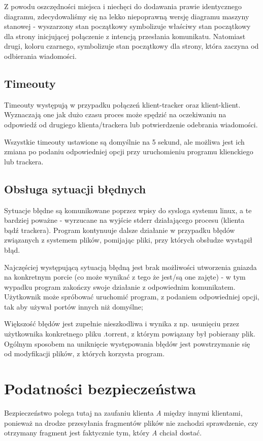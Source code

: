 \documentclass[11pt]{article}
\begin{document}
Z powodu oszczędności miejsca i niechęci do dodawania prawie identycznego diagramu, zdecydowaliśmy się na lekko niepoprawną wersję diagramu maszyny stanowej - wyszarzony stan początkowy symbolizuje właściwy stan początkowy dla strony inicjującej połączenie z intencją przesłania komunikatu. Natomiast drugi, koloru czarnego, symbolizuje stan początkowy dla strony, która zaczyna od odbierania wiadomości.

\subsection{Timeouty}
Timeouty występują w przypadku połączeń klient-tracker oraz klient-klient. Wyznaczają one jak dużo czasu proces może spędzić na oczekiwaniu na odpowiedź od drugiego klienta/trackera lub potwierdzenie odebrania wiadomości.	


Wszystkie timeouty ustawione są domyślnie na 5 sekund, ale możliwa jest ich zmiana po podaniu odpowiedniej opcji przy uruchomieniu programu klienckiego lub trackera.

\subsection{Obsługa sytuacji błędnych}
Sytuacje błędne są komunikowane poprzez wpisy do sysloga systemu linux, a te bardziej poważne - wyrzucane na wyjście stderr działającego procesu (klienta bądź trackera).	Program kontynuuje dalsze działanie w przypadku błędów związanych z systemem plików, pomijając pliki, przy których obsłudze wystąpił błąd.

Najczęściej występującą sytuacją błędną jest brak możliwości utworzenia gniazda na konkretnym porcie (co może wynikać z tego że jest/są one zajęte) - w tym wypadku program zakończy swoje działanie z odpowiednim komunikatem. Użytkownik może spróbować uruchomić program, z podaniem odpowiedniej opcji, tak aby używał portów innych niż domyślne;

Większość błędów jest zupełnie nieszkodliwa i wynika z np. usunięciu przez użytkownika konkretnego pliku .torrent, z którym powiązany był pobierany plik. Ogólnym sposobem na uniknięcie występowania błędów jest powstrzymanie się od modyfikacji plików, z których korzysta program.

\section{Podatności bezpieczeństwa}
Bezpieczeństwo polega tutaj na zaufaniu klienta \textsl{A} między innymi klientami, ponieważ na drodze przesyłania fragmentów plików nie zachodzi sprawdzenie, czy otrzymany fragment jest faktycznie tym, który \textsl{A} chciał dostać.	
\end{document}
